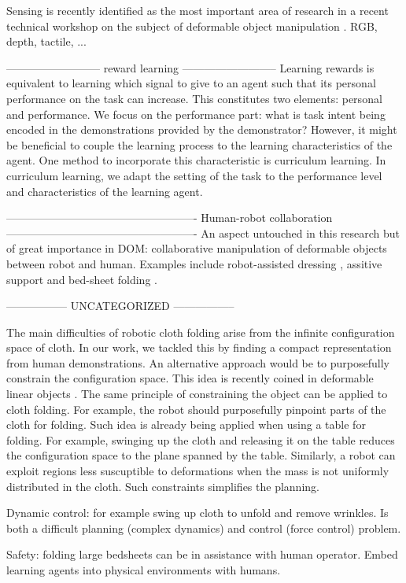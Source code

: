 \documentclass[\home/main.tex]{subfiles}
\begin{document}
 Sensing is recently identified as the most important area of research in a recent technical workshop on the subject of deformable object manipulation \autocite{zhu:hal-02980281}. RGB, depth, tactile, ... 


--------------------------
    reward learning
--------------------------
Learning rewards is equivalent to learning which signal to give to an agent such that its personal performance on the task can increase. This constitutes two elements: personal and performance. We focus on the performance part: what is task intent being encoded in the demonstrations provided by the demonstrator? However, it might be beneficial to couple the learning process to the learning characteristics of the agent. One method to incorporate this characteristic is curriculum learning. In curriculum learning, we adapt the setting of the task to the performance level and characteristics of the learning agent.  


 ----------------------------------------------------
    Human-robot collaboration
----------------------------------------------------
An aspect untouched in this research but of great importance in DOM: collaborative manipulation of deformable objects between robot and human. Examples include robot-assisted dressing \autocite{Gao2016}, assitive support \autocite{lu2017human} and bed-sheet folding \autocite{Kruse2015}.


-----------------
UNCATEGORIZED
----------------- 

The main difficulties of robotic cloth folding arise from the infinite configuration space of cloth. In our work, we tackled this by finding a compact representation from human demonstrations. An alternative approach would be to purposefully constrain the configuration space. This idea is recently coined in deformable linear objects \autocite{Zhu2020}. The same principle of constraining the object can be applied to cloth folding. For example, the robot should purposefully pinpoint parts of the cloth for folding. Such idea is already being applied when using a table for folding. For example, swinging up the cloth and releasing it on the table reduces the configuration space to the plane spanned by the table. Similarly, a robot can exploit regions less suscuptible to deformations when the mass is not uniformly distributed in the cloth. Such constraints simplifies the planning. 

Dynamic control: for example swing up cloth to unfold and remove wrinkles. Is both a difficult planning (complex dynamics) and control (force control) problem.


Safety: folding large bedsheets can be in assistance with human operator. Embed learning agents into physical environments with humans. 
\end{document}
